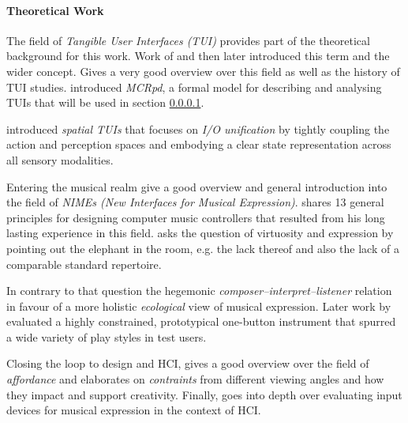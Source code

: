 \documentclass[10pt,a4paper]{scrartcl}
\begin{document}
\paragraph{Theoretical Work}
The field of \emph{Tangible User Interfaces (TUI)} provides part of the theoretical background for this work. Work of \cite{Fitzmaurice1995} and then later \cite{Ishii1997} introduced this term and the wider concept. \cite{Shaer2009} Gives a very good overview over this field as well as the history of TUI studies. \cite{Ullmer2000} introduced \emph{MCRpd}, a formal model for describing and analysing TUIs that will be used in section \ref{}.

\cite{Sharlin2004} introduced \emph{spatial TUIs} that focuses on \emph{I/O unification} by tightly coupling the action and perception spaces and embodying a clear state representation across all sensory modalities.


Entering the musical realm \cite{Fels2011} give a good overview and general introduction into the field of \emph{NIMEs (New Interfaces for Musical Expression)}. \cite{Cook2001} shares 13 general principles for designing computer music controllers that resulted from his long lasting experience in this field. \cite{Dobrian2006} asks the question of virtuosity and expression by pointing out the elephant in the room, e.g. the lack thereof and also the lack of a comparable standard repertoire. 

In contrary to that \cite{Gurevich2007} question the hegemonic \emph{composer--interpret--listener} relation in favour of a more holistic \emph{ecological} view of musical expression. Later work by \cite{Gurevich2010} evaluated a highly constrained, prototypical one-button instrument that spurred a wide variety of play styles in test users.

Closing the loop to design and HCI, \cite{Magnusson2010} gives a good overview over the field of \emph{affordance} and elaborates on \emph{contraints} from different viewing angles and how they impact and support creativity. Finally, \cite{Wanderley2002} goes into depth over evaluating input devices for musical expression in the context of HCI. 







\end{document}
